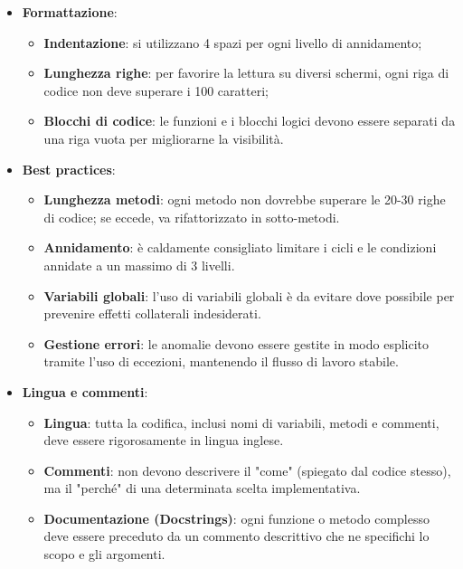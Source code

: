 \documentclass[a4paper,12pt]{article}
\begin{document}
{{{{\begin{itemize}
                    \item \textbf{Formattazione}:
                    \begin{itemize}
                        \item \textbf{Indentazione}: si utilizzano 4 spazi per ogni livello di annidamento;
                        \item \textbf{Lunghezza righe}: per favorire la lettura su diversi schermi, ogni riga di codice non deve superare i 100 caratteri;
                        \item \textbf{Blocchi di codice}: le funzioni e i blocchi logici devono essere separati da una riga vuota per migliorarne la visibilità.
                    \end{itemize}
                    
                    \item \textbf{Best practices}:
                    \begin{itemize}
                        \item \textbf{Lunghezza metodi}: ogni metodo non dovrebbe superare le 20-30 righe di codice; se eccede, va rifattorizzato in sotto-metodi.
                        \item \textbf{Annidamento}: è caldamente consigliato limitare i cicli e le condizioni annidate a un massimo di 3 livelli.
                        \item \textbf{Variabili globali}: l'uso di variabili globali è da evitare dove possibile per prevenire effetti collaterali indesiderati.
                        \item \textbf{Gestione errori}: le anomalie devono essere gestite in modo esplicito tramite l'uso di eccezioni, mantenendo il flusso di lavoro stabile.
                    \end{itemize}
                    
                    \item \textbf{Lingua e commenti}:
                    \begin{itemize}
                        \item \textbf{Lingua}: tutta la codifica, inclusi nomi di variabili, metodi e commenti, deve essere rigorosamente in lingua inglese.
                        \item \textbf{Commenti}: non devono descrivere il "come" (spiegato dal codice stesso), ma il "perché" di una determinata scelta implementativa.
                        \item \textbf{Documentazione (Docstrings)}: ogni funzione o metodo complesso deve essere preceduto da un commento descrittivo che ne specifichi lo scopo e gli argomenti.
                    \end{itemize}
                \end{itemize}
            }

}}}
\end{document}
